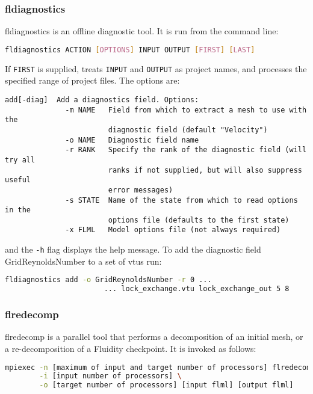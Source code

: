 \subsubsection{fldiagnostics}
\label{sec:fldiagnostics}
fldiagnostics is an offline diagnostic tool. It is run from the command line:

\begin{lstlisting}[language = Bash]
fldiagnostics ACTION [OPTIONS] INPUT OUTPUT [FIRST] [LAST]
\end{lstlisting}

If \lstinline[language = Bash]+FIRST+ is supplied, treats \lstinline[language = Bash]+INPUT+ and \lstinline[language = Bash]+OUTPUT+ as project names, and processes the specified range of project files. The options are:
\begin{lstlisting}
add[-diag]  Add a diagnostics field. Options:
              -m NAME   Field from which to extract a mesh to use with the
                        diagnostic field (default "Velocity")
              -o NAME   Diagnostic field name
              -r RANK   Specify the rank of the diagnostic field (will try all
                        ranks if not supplied, but will also suppress useful
                        error messages)
              -s STATE  Name of the state from which to read options in the
                        options file (defaults to the first state)
              -x FLML   Model options file (not always required)
\end{lstlisting}

and the \lstinline[language = Bash]+-h+ flag displays the help message. To add the diagnostic field GridReynoldsNumber to a set of vtus run:

\begin{lstlisting}[language = Bash]
fldiagnostics add -o GridReynoldsNumber -r 0 ...
			           ... lock_exchange.vtu lock_exchange_out 5 8
\end{lstlisting}


\subsubsection{flredecomp}
\label{sec:flredecomp}
flredecomp is a parallel tool that performs a decomposition of an initial mesh, or a re-decomposition of a Fluidity checkpoint.
It is invoked as follows:
\begin{lstlisting}[language=bash]
mpiexec -n [maximum of input and target number of processors] flredecomp \
        -i [input number of processors] \
        -o [target number of processors] [input flml] [output flml]
\end{lstlisting}

